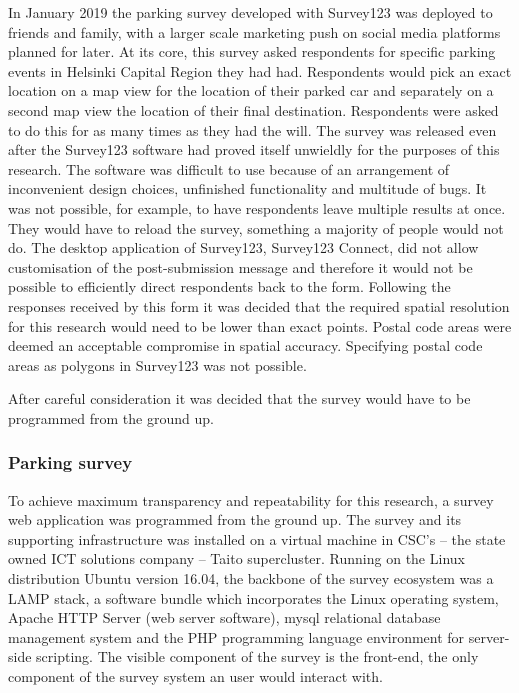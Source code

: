 In January 2019 the parking survey developed with Survey123 was deployed to friends and family, with a larger scale marketing push on social media platforms planned for later. At its core, this survey asked respondents for specific parking events in Helsinki Capital Region they had had. Respondents would pick an exact location on a map view for the location of their parked car and separately on a second map view the location of their final destination. Respondents were asked to do this for as many times as they had the will. The survey was released even after the Survey123 software had proved itself unwieldly for the purposes of this research. The software was difficult to use because of an arrangement of inconvenient design choices, unfinished functionality and multitude of bugs. It was not possible, for example, to have respondents leave multiple results at once. They would have to reload the survey, something a majority of people would not do. The desktop application of Survey123, Survey123 Connect, did not allow customisation of the post-submission message and therefore it would not be possible to efficiently direct respondents back to the form. Following the responses received by this form it was decided that the required spatial resolution for this research would need to be lower than exact points. Postal code areas were deemed an acceptable compromise in spatial accuracy. Specifying postal code areas as polygons in Survey123 was not possible. 

After careful consideration it was decided that the survey would have to be programmed from the ground up.

\subsubsection{Parking survey}
\justify
To achieve maximum transparency and repeatability for this research, a survey web application was programmed from the ground up. The survey and its supporting infrastructure was installed on a virtual machine in CSC's -- the state owned ICT solutions company -- Taito supercluster. Running on the Linux distribution Ubuntu version 16.04, the backbone of the survey ecosystem was a LAMP stack, a software bundle which incorporates the Linux operating system, Apache HTTP Server (web server software), \gls{mysql} relational database management system and the PHP programming language environment for server-side scripting. The visible component of the survey is the front-end, the only component of the survey system an user would interact with.

